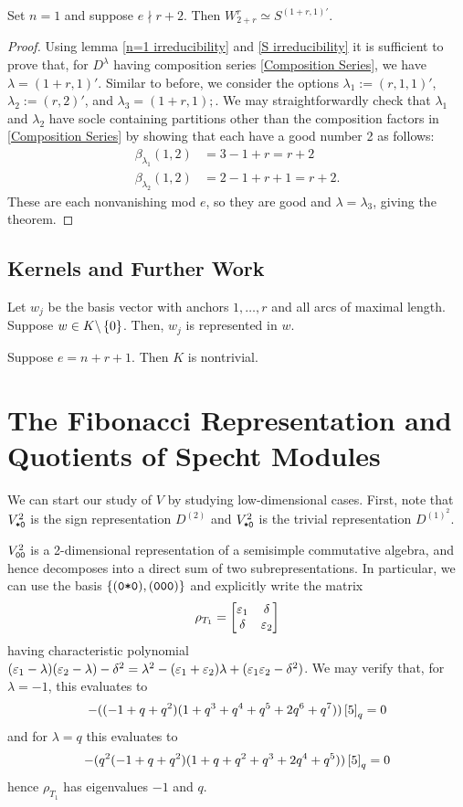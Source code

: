\documentclass{amsart}
\begin{document}
\begin{theorem}
  Set $n = 1$ and suppose $e \nmid r + 2$.
  Then $W_{2 + r}^r \simeq S^{(1+r,1)'}$.
\end{theorem}
\begin{proof}
  Using lemma \ref{n=1 irreducibility} and \ref{S irreducibility} it is sufficient to prove that, for $D^\lambda$ having composition series \eqref{Composition Series}, we have $\lambda = (1+r,1)'$.
  Similar to before, we consider the options $\lambda_1 := (r,1,1)'$, $\lambda_2 := (r,2)'$, and $\lambda_3 = (1+r,1);$.
  We may straightforwardly check that $\lambda_1$ and $\lambda_2$ have socle containing partitions other than the composition factors in \eqref{Composition Series} by showing that each have a good number 2 as follows:
  \begin{align*}
    \beta_{\lambda_1}(1,2) &= 3 - 1 + r = r+2\\
    \beta_{\lambda_2}(1,2) &= 2 - 1 + r + 1 = r+2.
  \end{align*}
  These are each nonvanishing mod $e$, so they are good and $\lambda = \lambda_3$, giving the theorem.
\end{proof}
\fi

\subsection{Kernels and Further Work}
\begin{lemma}\label{Represented}
  Let $w_j$ be the basis vector with anchors $1,\dots,r$ and all arcs of maximal length.
  Suppose $w \in K \backslash \left\{ 0 \right\}$.
  Then, $w_j$ is represented in $w$.
\end{lemma}
\begin{proposition}
  Suppose $e = n + r + 1$.
  Then $K$ is nontrivial.
\end{proposition}

\section{The Fibonacci Representation and Quotients of Specht Modules}
We can start our study of $V$ by studying low-dimensional cases.
First, note that $V_{\texttt{*}\texttt{0}}^2$ is the sign representation $D^{(2)}$ and $V_{\texttt{*}\texttt{0}}^2$ is the trivial representation $D^{(1)^2}$.

$V_{\texttt{0}\texttt{0}}^2$ is a 2-dimensional representation of a semisimple commutative algebra, and hence decomposes into a direct sum of two subrepresentations.
In particular, we can use the basis $\left\{ (\texttt{0}\texttt{*}\texttt{0}),(\texttt{0}\texttt{0}\texttt{0}) \right\}$ and explicitly write the matrix
\[
  \rho_{T_1} = \begin{bmatrix}
    \varepsilon_1 & \delta\\
    \delta & \varepsilon_2
  \end{bmatrix}
\]
having characteristic polynomial $(\varepsilon_1 - \lambda)(\varepsilon_2 - \lambda) - \delta^2 = \lambda^2 - (\varepsilon_1 + \varepsilon_2)\lambda +(\varepsilon_1\varepsilon_2 - \delta^2)$.
We may verify that, for $\lambda = -1$, this evaluates to
\[
  -((-1 + q + q^2) (1 + q^3 + q^4 + q^5 + 2 q^6 + q^7))\left[ 5 \right]_q = 0
\]
and for $\lambda = q$ this evaluates to 
\[
-(q^2 (-1 + q + q^2) (1 + q + q^2 + q^3 + 2 q^4 + q^5)) \left[ 5 \right]_q = 0
\]
hence $\rho_{T_1}$ has eigenvalues $-1$ and $q$.
\end{document}
